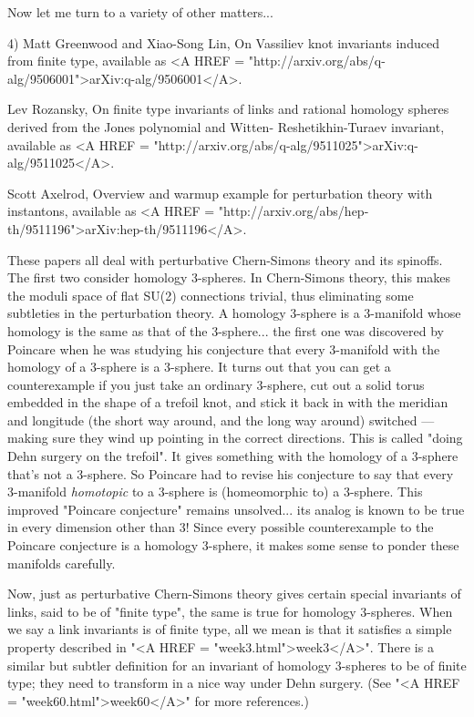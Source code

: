 Now let me turn to a variety of other matters...

4) Matt Greenwood and Xiao-Song Lin, On Vassiliev knot invariants induced
from finite type, available as
<A HREF = "http://arxiv.org/abs/q-alg/9506001">arXiv:q-alg/9506001</A>.

Lev Rozansky, On finite type invariants of links and rational homology
spheres derived from the Jones polynomial and Witten-
Reshetikhin-Turaev invariant, available as <A HREF =
"http://arxiv.org/abs/q-alg/9511025">arXiv:q-alg/9511025</A>.

Scott Axelrod, Overview and warmup example for perturbation theory with
instantons, available as 
<A HREF = "http://arxiv.org/abs/hep-th/9511196">arXiv:hep-th/9511196</A>.  

These papers all deal with perturbative Chern-Simons theory and its
spinoffs.  The first two consider homology 3-spheres.  In Chern-Simons
theory, this makes the moduli space of flat SU(2) connections trivial,
thus eliminating some subtleties in the perturbation theory.  A homology
3-sphere is a 3-manifold whose homology is the same as that of the
3-sphere... the first one was discovered by Poincare when he was
studying his conjecture that every 3-manifold with the homology of a
3-sphere is a 3-sphere. It turns out that you can get a counterexample
if you just take an ordinary 3-sphere, cut out a solid torus embedded in
the shape of a trefoil knot, and stick it back in with the meridian and
longitude (the short way around, and the long way around) switched ---
making sure they wind up pointing in the correct directions.  This is
called "doing Dehn surgery on the trefoil".  It gives something
with the homology of a 3-sphere that's not a 3-sphere.  So Poincare had
to revise his conjecture to say that every 3-manifold \emph{homotopic} to a
3-sphere is (homeomorphic to) a 3-sphere.  This improved "Poincare
conjecture" remains unsolved... its analog is known to be true in every
dimension other than 3!  Since every possible counterexample to the
Poincare conjecture is a homology 3-sphere, it makes some sense to ponder
these manifolds carefully.

Now, just as perturbative Chern-Simons theory gives certain special
invariants of links, said to be of "finite type", the same is
true for homology 3-spheres.  When we say a link invariants is of finite
type, all we mean is that it satisfies a simple property described in
"<A HREF = "week3.html">week3</A>".  There is a similar but
subtler definition for an invariant of homology 3-spheres to be of
finite type; they need to transform in a nice way under Dehn surgery.
(See "<A HREF = "week60.html">week60</A>" for more references.)

